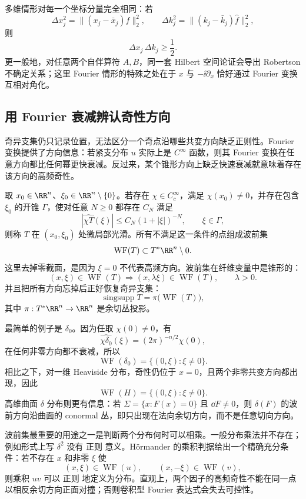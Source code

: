 多维情形对每一个坐标分量完全相同：若
\[
\Delta x_j^2
=\|(x_j-\bar x_j)f\|_2^2,
\qquad
\Delta k_j^2
=\|(k_j-\bar k_j)\widehat f\|_2^2,
\]
则
\[
\Delta x_j\,\Delta k_j\ge\frac12.
\]
更一般地，对任意两个自伴算符 $A,B$，同一套 Hilbert 空间论证会导出 Robertson 不确定关系；这里 Fourier 情形的特殊之处在于 $x$ 与 $-\ii\partial_x$ 恰好通过 Fourier 变换互相对角化。

\subsection{用 Fourier 衰减辨认奇性方向}

奇异支集仍只记录位置，无法区分一个奇点沿哪些共变方向缺乏正则性。Fourier 变换提供了方向信息：若紧支分布 $u$ 实际上是 $C^\infty$ 函数，则其 Fourier 变换在任意方向都比任何幂更快衰减。反过来，某个锥形方向上缺乏快速衰减就意味着存在该方向的高频奇性。

取 $x_0\in\RR^n$、$\xi_0\in\RR^n\setminus\{0\}$。若存在 $\chi\in C_c^\infty$，满足 $\chi(x_0)\neq0$，并存在包含 $\xi_0$ 的开锥 $\Gamma$，使对任意 $N\ge0$ 都存在 $C_N$ 满足
\[
\boxed{
|\widehat{\chi T}(\xi)|
\le C_N(1+|\xi|)^{-N},
\qquad \xi\in\Gamma
},
\]
则称 $T$ 在 $(x_0,\xi_0)$ 处微局部光滑。所有不满足这一条件的点组成波前集
\[
\operatorname{WF}(T)
\subset T^*\RR^n\setminus0.
\]
这里去掉零截面，是因为 $\xi=0$ 不代表高频方向。波前集在纤维变量中是锥形的：
\[
(x,\xi)\in\operatorname{WF}(T)
\Longrightarrow
(x,\lambda\xi)\in\operatorname{WF}(T),
\qquad \lambda>0.
\]
并且把所有方向忘掉后正好恢复奇异支集：
\[
\boxed{
\operatorname{singsupp}T
=
\pi\bigl(\operatorname{WF}(T)\bigr)
},
\]
其中 $\pi:T^*\RR^n\to\RR^n$ 是余切丛投影。

最简单的例子是 $\delta_0$。因为任取 $\chi(0)\neq0$，有
\[
\widehat{\chi\delta_0}(\xi)=(2\pi)^{-n/2}\chi(0),
\]
在任何非零方向都不衰减，所以
\[
\operatorname{WF}(\delta_0)
=\{(0,\xi):\xi\neq0\}.
\]
相比之下，对一维 Heaviside 分布，奇性仍位于 $x=0$，且两个非零共变方向都出现，因此
\[
\operatorname{WF}(H)
=\{(0,\xi):\xi\neq0\}.
\]
高维曲面 $\delta$ 分布则更有信息：若 $\Sigma=\{x:F(x)=0\}$ 且 $\dd F\neq0$，则 $\delta(F)$ 的波前方向沿曲面的 conormal 丛，即只出现在法向余切方向，而不是任意切向方向。

波前集最重要的用途之一是判断两个分布何时可以相乘。一般分布乘法并不存在；例如形式上写 $\delta^2$ 没有 正则 意义。Hörmander 的乘积判据给出一个精确充分条件：若不存在 $x$ 和非零 $\xi$ 使
\[
(x,\xi)\in\operatorname{WF}(u),
\qquad
(x,-\xi)\in\operatorname{WF}(v),
\]
则乘积 $uv$ 可以 正则 地定义为分布。直观上，两个因子的高频奇性不能在同一点以相反余切方向正面对撞；否则卷积型 Fourier 表达式会失去可控性。


